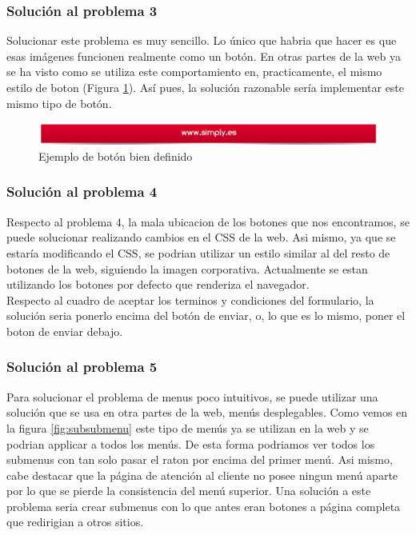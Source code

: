 \documentclass[a4paper,11pt]{article}
\begin{document}
\subsubsection{Solución al problema 3}
Solucionar este problema es muy sencillo. Lo único que habria que hacer es que esas imágenes funcionen realmente como un botón. En otras partes de la web ya se ha visto como se utiliza este comportamiento en, practicamente, el mismo estilo de boton (Figura \ref{fig:siesunboton}). Así pues, la solución razonable sería implementar este mismo tipo de botón.

\begin{figure}[h!]
 \centering
 \includegraphics[scale=0.4]{siesunboton.png}
 \caption{Ejemplo de botón bien definido}
 \label{fig:siesunboton}
\end{figure}

\subsubsection{Solución al problema 4}
Respecto al problema 4, la mala ubicacion de los botones que nos encontramos, se puede solucionar realizando cambios en el CSS de la web. Asi mismo, ya que se estaría modificando el CSS, se podrian utilizar un estilo similar al del resto de botones de la web, siguiendo la imagen corporativa. Actualmente se estan utilizando los botones por defecto que renderiza el navegador.\\
Respecto al cuadro de aceptar los terminos y condiciones del formulario, la solución seria ponerlo encima del botón de enviar, o, lo que es lo mismo, poner el boton de enviar debajo.

\subsubsection{Solución al problema 5}
Para solucionar el problema de menus poco intuitivos, se puede utilizar una solución que se usa en otra partes de la web, menús desplegables.
Como vemos en la figura \ref{fig:subsubmenu} este tipo de menús ya se utilizan en la web y se podrian applicar a todos los menús. De esta forma podriamos ver todos los submenus con tan solo pasar el raton por encima del primer menú. Asi mismo, cabe destacar que la página de atención al cliente no posee ningun menú aparte por lo que se pierde la consistencia del menú superior. Una solución a este problema seria crear submenus con lo que antes eran botones a página completa que redirigian a otros sitios.
\end{document}
